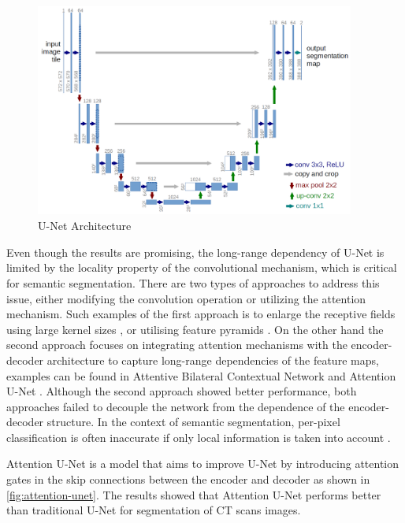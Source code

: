 \begin{figure}[ht]
\includegraphics[width=10.5cm, height=7cm]{images/unet.png}
\centering
\caption{U-Net Architecture \protect\cite{unet}}
\label{fig:unet}
\end{figure}

Even though the results are promising, the long-range dependency of U-Net is limited by the locality property of the convolutional mechanism, which is critical for semantic segmentation. There are two types of approaches to address this issue, either modifying the convolution operation or utilizing the attention mechanism. Such examples of the first approach is to enlarge the receptive fields using large kernel sizes \cite{enlarge-receptive-field}, or utilising feature pyramids \cite{feature-pyramid}. On the other hand the second approach focuses on integrating attention mechanisms with the encoder-decoder architecture to capture long-range dependencies of the feature maps, examples can be found in Attentive Bilateral Contextual Network \cite{abcnet} and Attention U-Net \cite{attention-unet}. Although the second approach showed better performance, both approaches failed to decouple the network from the dependence of the encoder-decoder structure. In the context of semantic segmentation, per-pixel classification is often inaccurate if only local information is taken into account \cite{swin-v1}.

Attention U-Net \cite{attention-unet} is a model that aims to improve U-Net by introducing attention gates in the skip connections between the encoder and decoder as shown in \ref{fig:attention-unet}. The results showed that Attention U-Net performs better than traditional U-Net for segmentation of CT scans images.

